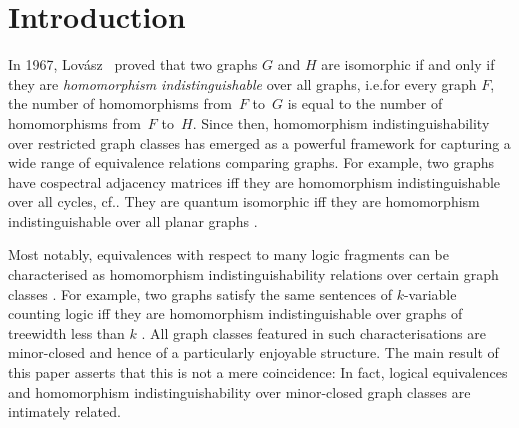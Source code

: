 \documentclass[3p,final]{elsarticle}
\begin{document}
	\section{Introduction}
	\label{sec:intro}
	
	
	In 1967, Lovász~\cite{lovasz_operations_1967} proved that two graphs $G$ and $H$ are isomorphic if and only if they are \emph{homomorphism indistinguishable} over all graphs, i.e.\@ for every graph $F$, the number of homomorphisms from~$F$ to~$G$ is equal to the number of homomorphisms from~$F$ to~$H$.
	Since then, homomorphism indistinguishability over restricted graph classes has emerged as a powerful framework for capturing a wide range of equivalence relations comparing graphs.
	For example, two graphs have cospectral adjacency matrices iff they are homomorphism indistinguishable over all cycles, cf.\@ \cite{dell_lovasz_2018}.
	They are quantum isomorphic iff they are homomorphism indistinguishable over all planar graphs \cite{mancinska_quantum_2019}.

	
	Most notably, equivalences with respect to many logic fragments can be characterised as homomorphism indistinguishability relations over certain graph classes \cite{grohe_counting_2020,dawar_lovasz-type_2021,montacute_pebble_2022,rattan_weisfeiler_2023}. 
	For example, two graphs satisfy the same sentences of $k$-variable counting logic iff they are homomorphism indistinguishable over graphs of treewidth less than $k$ \cite{dvorak_recognizing_2010}. 
	All graph classes featured in such characterisations are minor-closed and hence of a particularly enjoyable structure.
	The main result of this paper asserts that this is not a mere coincidence:
	In fact, logical equivalences and homomorphism indistinguishability over minor-closed graph classes are intimately related. 
	
\end{document}

